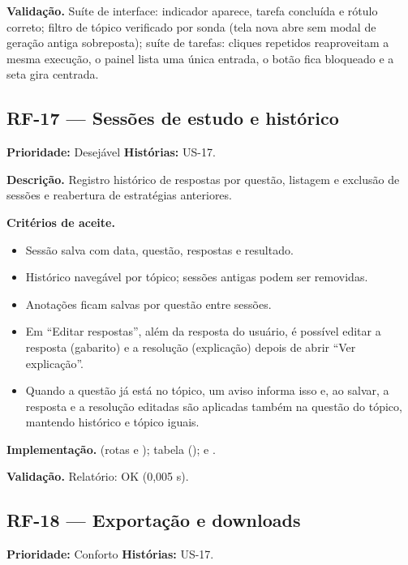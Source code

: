 \textbf{Validação.} Suíte de interface: indicador aparece, tarefa concluída e rótulo correto; filtro de tópico verificado por sonda (tela nova abre sem modal de geração antiga sobreposta); suíte de tarefas: cliques repetidos reaproveitam a mesma execução, o painel lista uma única entrada, o botão fica bloqueado e a seta gira centrada.

\subsection{RF-17 --- Sessões de estudo e histórico}

\textbf{Prioridade:} Desejável \quad \textbf{Histórias:} US-17.

\textbf{Descrição.} Registro histórico de respostas por questão, listagem e exclusão de sessões e reabertura de estratégias anteriores.

\textbf{Critérios de aceite.}
\begin{itemize}
    \item Sessão salva com data, questão, respostas e resultado.
    \item Histórico navegável por tópico; sessões antigas podem ser removidas.
    \item Anotações ficam salvas por questão entre sessões.
    \item Em ``Editar respostas'', além da resposta do usuário, é possível editar a resposta (gabarito) e a resolução (explicação) depois de abrir ``Ver explicação''.
    \item Quando a questão já está no tópico, um aviso informa isso e, ao salvar, a resposta e a resolução editadas são aplicadas também na questão do tópico, mantendo histórico e tópico iguais.
\end{itemize}

\textbf{Implementação.}  (rotas \texttt{} e \texttt{}); tabela \texttt{} ();  e .

\textbf{Validação.} Relatório: \texttt{} OK (0,005 s).

\subsection{RF-18 --- Exportação e downloads}

\textbf{Prioridade:} Conforto \quad \textbf{Histórias:} US-17.

